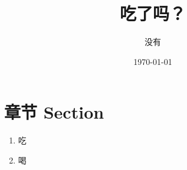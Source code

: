 \documentclass[a4paper,10pt]{article}
\title{吃了吗？}
\author{没有}
\date{\today}
\begin{document}
    \maketitle

\section{章节 Section}

\begin{enumerate}
\item 吃
\item 喝
\end{enumerate}
\end{document}
